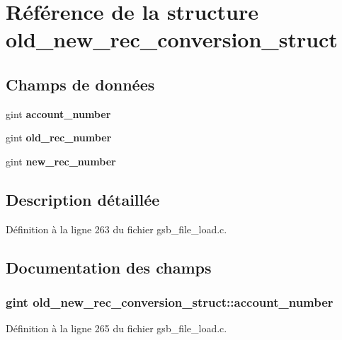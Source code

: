 \section{Référence de la structure old\_\-new\_\-rec\_\-conversion\_\-struct}
\label{structold__new__rec__conversion__struct}
\subsection*{Champs de données}
\begin{DoxyCompactItemize}
\item 
gint {\bf account\_\-number}
\item 
gint {\bf old\_\-rec\_\-number}
\item 
gint {\bf new\_\-rec\_\-number}
\end{DoxyCompactItemize}


\subsection{Description détaillée}


Définition à la ligne 263 du fichier gsb\_\-file\_\-load.c.



\subsection{Documentation des champs}
\subsubsection[{account\_\-number}]{\setlength{\rightskip}{0pt plus 5cm}gint {\bf old\_\-new\_\-rec\_\-conversion\_\-struct::account\_\-number}}\label{structold__new__rec__conversion__struct_a5af74c5b32e2dff68b4f2fb880b72da8}


Définition à la ligne 265 du fichier gsb\_\-file\_\-load.c.

